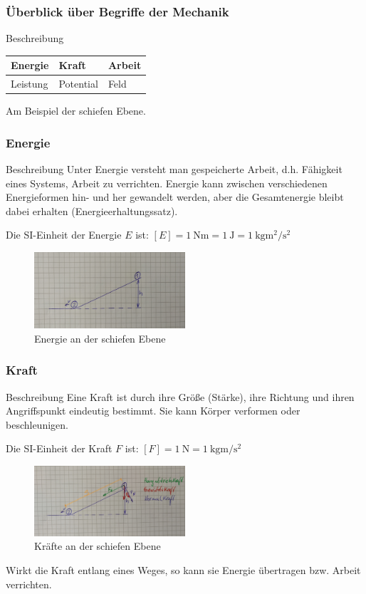 \documentclass{article}
\begin{document}
\frame
{
  \frametitle{Überblick über Begriffe der Mechanik}
\begin{block}{Beschreibung}
\vspace{0.5cm}
\begin{tabular}{|>{\centering\arraybackslash}p{3cm}|>{\centering\arraybackslash}p{3cm}|>{\centering\arraybackslash}p{3cm}|}
\hline
\rule[-1ex]{0pt}{2.5ex} Energie & Kraft & Arbeit \\
\hline 
\rule[-1ex]{0pt}{2.5ex} Leistung & Potential & Feld \\ 
\hline 
\end{tabular}
\vspace{0.5cm}
\end{block}
Am Beispiel der schiefen Ebene.
}

\frame
{
  \frametitle{Energie}
\begin{block}{Beschreibung}
Unter Energie versteht man gespeicherte Arbeit, d.h. Fähigkeit eines Systems, Arbeit zu verrichten. Energie kann zwischen verschiedenen Energieformen hin- und her gewandelt werden, aber die Gesamtenergie bleibt dabei erhalten (Energieerhaltungssatz).
\end{block}
Die SI-Einheit der Energie $E$ ist:
$[E]=\SI{1}{\newton\meter}=\SI{1}{\joule}=\SI{1}{\kilo\gram\square\meter\per\square\second}$
      \begin{figure}
	  \includegraphics[width=0.5\textwidth]{Energie_1}
	  \vspace{-3mm}
	  \caption{Energie an der schiefen Ebene}
   \end{figure}
}

\frame
{
  \frametitle{Kraft}
\begin{block}{Beschreibung}
Eine Kraft ist durch ihre Größe (Stärke), ihre Richtung und ihren Angriffspunkt eindeutig bestimmt. Sie kann Körper verformen oder beschleunigen.
\end{block}
Die SI-Einheit der Kraft $F$ ist:
$[F]=\SI{1}{\newton}=\SI{1}{\kilo\gram\meter\per\square\second}$
      \begin{figure}
	  \includegraphics[width=0.5\textwidth]{Kraft}
	  \vspace{-3mm}
	  \caption{Kräfte an der schiefen Ebene}
   \end{figure}
     Wirkt die Kraft entlang eines Weges, so kann sie Energie übertragen bzw. Arbeit verrichten.
}
\end{document}
